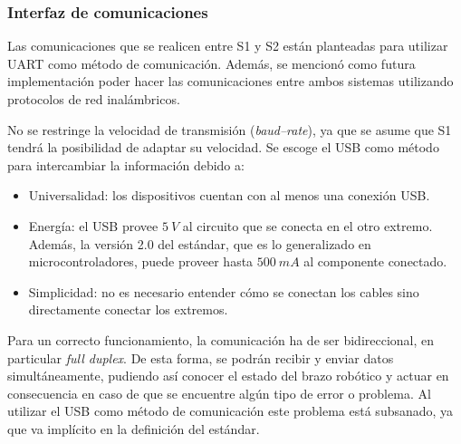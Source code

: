 \subsubsection{Interfaz de comunicaciones}
Las comunicaciones que se realicen entre \ac{S1} y \ac{S2} están planteadas para utilizar \ac{UART} como método de comunicación. Además, se mencionó como futura implementación poder hacer las comunicaciones entre ambos sistemas utilizando protocolos de red inalámbricos.

No se restringe la velocidad de transmisión (\textit{baud--rate}), ya que se asume que \ac{S1} tendrá la posibilidad de adaptar su velocidad. Se escoge el \ac{USB} como método para intercambiar la información debido a:

\begin{itemize}
    \item Universalidad: los dispositivos cuentan con al menos una conexión \ac{USB}.
    \item Energía: el \ac{USB} provee $5~V$ al circuito que se conecta en el otro extremo. Además, la versión 2.0 del estándar, que es lo generalizado en microcontroladores, puede proveer hasta $500~mA$ al componente conectado.
    \item Simplicidad: no es necesario entender cómo se conectan los cables sino directamente conectar los extremos.
\end{itemize}

Para un correcto funcionamiento, la comunicación ha de ser bidireccional, en particular \textit{full duplex}. De esta forma, se podrán recibir y enviar datos simultáneamente, pudiendo así conocer el estado del brazo robótico y actuar en consecuencia en caso de que se encuentre algún tipo de error o problema. Al utilizar el \ac{USB} como método de comunicación este problema está subsanado, ya que va implícito en la definición del estándar.